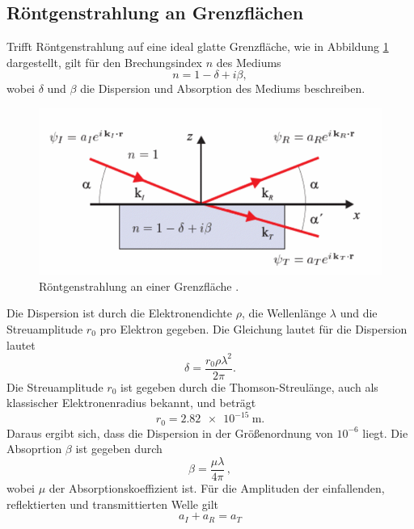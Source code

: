\subsection{Röntgenstrahlung an Grenzflächen} \label{sec:reflektivität}
Trifft Röntgenstrahlung auf eine ideal glatte Grenzfläche, 
wie in Abbildung \ref{fig:reflektivität} dargestellt,
gilt für den Brechungsindex $n$ des Mediums
\begin{equation}
    n = 1 - \delta + i\beta,
\end{equation}
wobei $\delta$ und $\beta$ die Dispersion und Absorption des Mediums beschreiben.
\begin{figure}[H]
    \centering
    \includegraphics[scale=0.5]{Bilder/reflektion.png}
    \caption{Röntgenstrahlung an einer Grenzfläche \cite{als-nielsen2011}.}
    \label{fig:reflektivität}
\end{figure}
Die Dispersion ist durch die Elektronendichte $\rho$, die Wellenlänge $\lambda$ 
und die Streuamplitude $r_0$ pro Elektron gegeben.
Die Gleichung lautet für die Dispersion lautet
\begin{equation}
    \delta = \frac{r_0 \rho \lambda^2}{2\pi} .
    \label{eq:delta}
\end{equation}
Die Streuamplitude $r_0$ ist gegeben durch die Thomson-Streulänge, 
auch als klassischer Elektronenradius bekannt, und beträgt
\begin{equation}
    r_0 = \SI{2.82e-15}{\meter} .
\end{equation}
Daraus ergibt sich, dass die Dispersion in der Größenordnung von $10^{-6}$ liegt.
Die Absoprtion $\beta$ ist gegeben durch
\begin{equation}
    \beta = \frac{\mu \lambda}{4 \pi} \, ,
    \label{eq:beta}
\end{equation}
wobei $\mu$ der Absorptionskoeffizient ist.
Für die Amplituden der einfallenden, reflektierten und transmittierten Welle gilt
\begin{equation}
    a_I + a_R = a_T 
    \label{eq:amplituden}
\end{equation}
